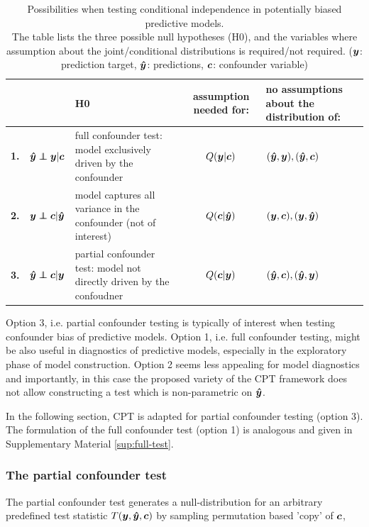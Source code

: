 \documentclass{article}
\begin{document}
\renewcommand{\arraystretch}{1.2}
\begin{table}[]
\centering
\begin{tabular}{l|rp{60mm}|c|>{\centering\arraybackslash}m{30mm}}
 &  & H0  & assumption needed for: & no assumptions about the distribution of: \\
\hline
\textbf{1.} & $\yhat \independent \y | \c$ \quad  & full confounder test: model exclusively driven by the confounder & $Q(\boldsymbol{y}|\boldsymbol{c})$ & $(\boldsymbol{\hat{y}},\boldsymbol{y}), (\boldsymbol{\hat{y}}, \boldsymbol{c})$ \\
\textbf{2.} & $\y \independent \c | \yhat$ \quad & model captures all variance in the confounder (not of interest) & $Q(\boldsymbol{c}|\boldsymbol{\hat{y}})$ & $(\boldsymbol{y}, \boldsymbol{c}), (\boldsymbol{y}, \boldsymbol{\hat{y}})$ \\
\textbf{3.} & $\yhat \independent \c | \y$  \quad &  partial confounder  test: model not directly driven by the confoudner & $Q(\boldsymbol{c}|\boldsymbol{y})$ & $(\boldsymbol{\hat{y}}, \boldsymbol{c}), (\boldsymbol{\hat{y}}, \boldsymbol{y})$ \\
\end{tabular}
\caption{\label{tab:conditional-independence-cases} Possibilities when testing conditional independence in potentially biased predictive models. \\The table lists the three possible null hypotheses (H0), and the variables where assumption about the joint/conditional distributions is required/not required.   ($\boldsymbol{y}$: prediction target, $\boldsymbol{\hat{y}}$: predictions, $\boldsymbol{c}$: confounder variable) }
\end{table}

Option 3, i.e. partial confounder testing is typically of interest when testing confounder bias of predictive models. Option 1, i.e. full confounder testing, might be also useful in diagnostics of predictive models, especially in the exploratory phase of model construction. Option 2 seems less appealing for model diagnostics and importantly, in this case the proposed variety of the CPT framework does not allow constructing a test which is non-parametric on $\boldsymbol{\hat{y}}$.

In the following section, CPT is adapted for partial confounder testing (option 3). The formulation of the full confounder test (option 1) is analogous and given in Supplementary Material \ref{sup:full-test}.
\subsubsection*{The partial confounder test}

The partial confounder test generates a null-distribution for an arbitrary predefined test statistic $T(\boldsymbol{y},\boldsymbol{\hat{y}},\boldsymbol{c})$ by sampling permutation based 'copy' of $\boldsymbol{c}$,
\end{document}

